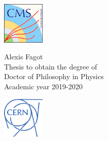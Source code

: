 \documentclass[10pt,a4paper,twoside,dutch,english,openright,leqno]{book}
\begin{document}
 \begin{minipage}{2.0cm}%
     \href{https://cms.cern/}{\includegraphics*[width=2.0cm]{CMS.pdf}}
 \end{minipage}\hfill
 \begin{minipage}{7cm}
 \centering
 \LARGE\textsf{Alexis Fagot\\}
 \vspace{5mm}
 \normalsize\textsf{Thesis to obtain the degree of\\
 Doctor of Philosophy in Physics\\
 Academic year 2019-2020}
 \end{minipage}\hfill
 \begin{minipage}{2.0cm}%
     \href{https://home.cern/}{\includegraphics*[width=2.0cm]{CERN.pdf}}
 \end{minipage}\hfill
\clearpage{\pagestyle{empty}\cleardoublepage}


\frontmatter
\renewcommand{\contentsname}{Table of Contents}
\tableofcontents

\renewcommand{\bibname}{References}





\mainmatter     %
\renewcommand*{\thesection}{\thechapter.\arabic{section}}
\end{document}
